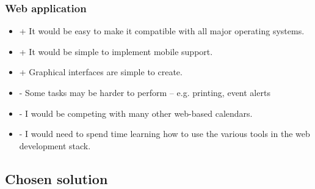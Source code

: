 \subsubsection{Web application}

\begin{itemize}
  \item + It would be easy to make it compatible with all major operating
          systems.
  \item + It would be simple to implement mobile support.
  \item + Graphical interfaces are simple to create.
  \item - Some tasks may be harder to perform -- e.g. printing, event alerts
  \item - I would be competing with many other web-based calendars.
  \item - I would need to spend time learning how to use the various tools in
          the web development stack.
\end{itemize}


\subsection{Chosen solution}


